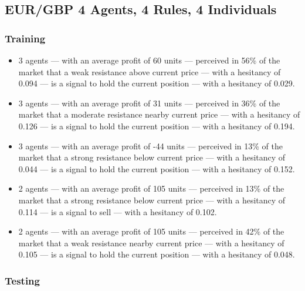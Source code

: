 \subsection{EUR/GBP 4 Agents, 4 Rules, 4 Individuals}
\label{}

\subsubsection{Training}
\label{}

{\scriptsize
  \begin{itemize}
    \item 3 agents — with an average profit of 60 units — perceived in 56\% of
      the market that a weak resistance above current price — with a hesitancy
      of 0.094 — is a signal to hold the current position — with a hesitancy of
      0.029.
\item 3 agents — with an average profit of 31 units — perceived in 36\% of the
  market that a moderate resistance nearby current price — with a hesitancy of
  0.126 — is a signal to hold the current position — with a hesitancy of 0.194.
\item 3 agents — with an average profit of -44 units — perceived in 13\% of the
  market that a strong resistance below current price — with a hesitancy of
  0.044 — is a signal to hold the current position — with a hesitancy of 0.152.
\item 2 agents — with an average profit of 105 units — perceived in 13\% of the
  market that a strong resistance below current price — with a hesitancy of
  0.114 — is a signal to sell — with a hesitancy of 0.102.
\item 2 agents — with an average profit of 105 units — perceived in 42\% of the
  market that a weak resistance nearby current price — with a hesitancy of 0.105
  — is a signal to hold the current position — with a hesitancy of 0.048.
  \end{itemize}
}

\subsubsection{Testing}
\label{}

